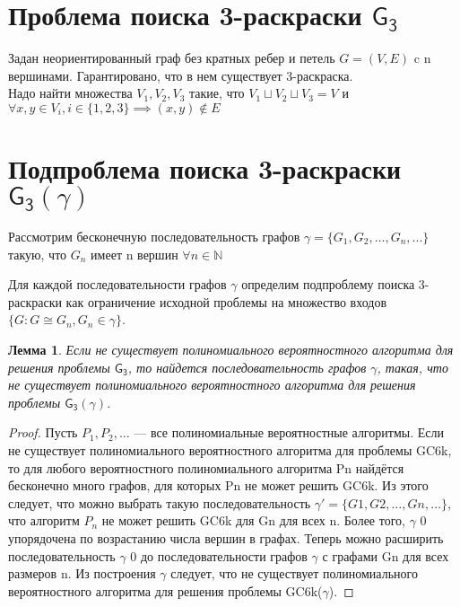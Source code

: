 \documentclass[a4paper, 12pt]{article}
\newtheorem{lemma}{Лемма}
\theoremstyle{definition}
\theoremstyle{remark}
\begin{document}
\section*{Проблема поиска 3-раскраски $\mathsf{G_3}$}
Задан неориентированный граф без кратных ребер и петель $G = (V, E)$ c n вершинами. Гарантировано,
что в нем существует 3-раскраска.
\\
Надо найти
    множества $V_1, V_2, V_3$ такие, что $V_1\sqcup V_2 \sqcup V_3 = V$ и
    $\forall x, y\in V_i, i\in \{1, 2, 3\} \implies (x, y)\notin E$

\section*{Подпроблема поиска 3-раскраски $\mathsf{G_3}(\gamma)$}
Рассмотрим бесконечную последовательность графов $\gamma = \{G_1, G_2, ..., G_n, ...\}$
такую, что $G_n$ имеет n вершин $\forall n\in \mathbb N$

Для каждой последовательности графов $\gamma$ определим подпроблему поиска 3-раскраски
как ограничение исходной проблемы на множество входов $\{G: G\cong G_n, G_n \in \gamma\}$.

\begin{lemma}
    Если не существует полиномиального вероятностного алгоритма для
решения проблемы $\mathsf{G_3}$, то найдется последовательность графов $\gamma$, такая,
 что не существует полиномиального вероятностного алгоритма для решения
  проблемы $\mathsf{G_3}(\gamma)$.
\end{lemma}

\begin{proof}
    Пусть $P_1, P_2, \dots$ — все полиномиальные вероятностные алгоритмы. Если не существует полиномиального вероятностного алгоритма для проблемы
GC6k, то для любого вероятностного полиномиального алгоритма Pn найдётся бесконечно много графов, для которых Pn не может решить GC6k. Из этого следует, что
можно выбрать такую последовательность $\gamma'
 = \{G1, G2, \dots , Gn, \dots\}$, что алгоритм $P_n$
не может решить GC6k для Gn для всех n. Более того, $\gamma$
0 упорядочена по возрастанию
числа вершин в графах. Теперь можно расширить последовательность $\gamma$
0 до последовательности графов $\gamma$ с графами Gn для всех размеров n. Из построения $\gamma$ следует,
что не существует полиномиального вероятностного алгоритма для решения проблемы GC6k($\gamma$).
\end{proof}
\end{document}
